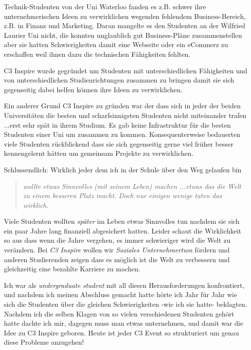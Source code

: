 Technik-Studenten von der Uni Waterloo fanden es z.B. schwer ihre 
unternehmerischen Ideen zu verwirklichen wegenden fehlendem 
Business-Bereich, z.B. in Finanz und Marketing. 
Daran mangelte es den Studenten an der Wilfried Laurier Uni nicht, die 
konnten unglaublich gut Business-Pläne zusammenstellen aber sie hatten 
Schwierigkeiten damit eine Webseite oder ein eCommerz zu erschaffen 
weil ihnen dazu die technischen Fähigkeiten fehlten. 

C3 Inspire wurde gegründet um Studenten mit unterschiedlichen 
Fähigkeiten und von unterschiedlichen Studienrichtungen zusammen zu 
bringen damit sie sich gegenseitig dabei helfen können ihre Ideen zu 
verwirklichen. 

Ein anderer Grund C3 Inspire zu gründen war der dass sich in jeder der 
beiden Universitäten die besten und scharfsinnigsten Studenten nicht 
miteinander trafen ...erst sehr spät in ihrem Studium. Es gab keine 
Infrastruktur für die besten Studenten einer Uni um zusammen zu kommen. 
Konsequenterweise bedauerten viele Studenten rückblickend dass sie 
sich gegenseitig gerne viel früher besser kennengelernt hätten um 
gemeinsam Projekte zu verwirklichen. 

Schlussendlich: Wirklich jeder dem ich in der Schule über den Weg 
gelaufen bin \begin{quote}\textit{wollte etwas Sinnvolles (mit seinem Leben) machen ...etwas 
das die Welt zu einem besseren Platz macht. Doch nur einigen wenige 
taten das wirklich.}\end{quote} Viele Studenten wollten \textit{später} im Leben etwas 
Sinnvolles tun nachdem sie sich ein paar Jahre lang finanziell 
abgesichert hatten. Leider schaut die Wirklichkeit so aus dass wenn die 
Jahre vergehen, es immer schwieriger wird die Welt zu verändern. Bei 
\textit{C3 Inspire} wollen wir \textit{Soziales Unternehmertum} fördern und anderen 
Studierenden zeigen dass es möglich ist die Welt zu verbessern und 
gleichzeitig eine bezahlte Karriere zu machen. 

Ich war als \textit{undergraduate student} mit all diesen Herausforderungen 
konfrontiert, und nachdem ich meinen Abschluss gemacht hatte hörte ich 
Jahr für Jahr wie sich die Studenten über die gleichen 
Schwierigkeiten -wie ich sie hatte- beklagten. Nachdem ich die selben 
Klagen von so vielen verschiedenen Studenten gehört hatte dachte ich  
mir, dagegen muss man etwas unternehmen, und damit war die Idee zu C3 
Inspire geboren. Heute ist jeder C3 Event so strukturiert um genau 
diese Probleme anzugehen! 

